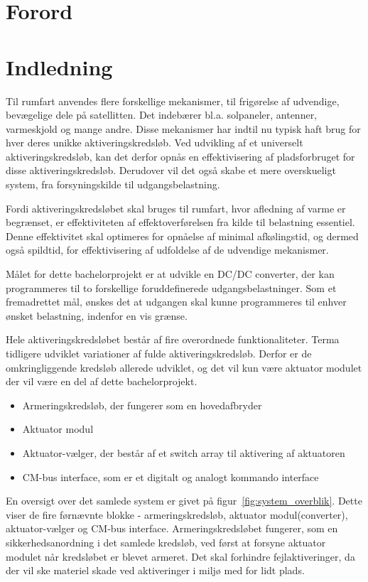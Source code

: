 
\chapter*{Forord}


{\let\clearpage\relax \chapter{Indledning}}
Til rumfart anvendes flere forskellige mekanismer, til frigørelse af udvendige, bevægelige dele på satellitten. Det indebærer bl.a. solpaneler, antenner, varmeskjold og mange andre. Disse mekanismer har indtil nu typisk haft brug for hver deres unikke aktiveringskredsløb. Ved udvikling af et universelt aktiveringskredsløb, kan det derfor opnås en effektivisering af pladsforbruget for disse aktiveringskredsløb. Derudover vil det også skabe et mere overskueligt system, fra forsyningskilde til udgangsbelastning. 

Fordi aktiveringskredsløbet skal bruges til rumfart, hvor afledning af varme er begrænset, er effektiviteten af effektoverførelsen fra kilde til belastning essentiel. Denne effektivitet skal optimeres for opnåelse af minimal afkølingstid, og dermed også spildtid, for effektivisering af udfoldelse af de udvendige mekanismer\cite{projekt-oplag}. 

Målet for dette bachelorprojekt er at udvikle en DC/DC converter, der kan programmeres til to forskellige foruddefinerede udgangsbelastninger. Som et fremadrettet mål, ønskes det at udgangen skal kunne programmeres til enhver ønsket belastning, indenfor en vis grænse. 


Hele aktiveringskredsløbet består af fire overordnede funktionaliteter. Terma tidligere udviklet variationer af fulde aktiveringskredsløb. Derfor er de omkringliggende kredsløb allerede udviklet, og det vil kun være aktuator modulet der vil være en del af dette bachelorprojekt.
\begin{itemize}
	\item Armeringskredsløb, der fungerer som en hovedafbryder
	\item Aktuator modul
	\item Aktuator-vælger, der består af et switch array til aktivering af aktuatoren
	\item CM-bus interface, som er et digitalt og analogt kommando interface
\end{itemize}

En oversigt over det samlede system er givet på figur~\ref{fig:system_overblik}. Dette viser de fire førnævnte blokke - armeringskredsløb, aktuator modul(converter), aktuator-vælger og CM-bus interface. Armeringskredsløbet fungerer, som en sikkerhedsanordning i det samlede kredsløb, ved først at forsyne aktuator modulet når kredsløbet er blevet armeret. Det skal forhindre fejlaktiveringer, da der vil ske materiel skade ved aktiveringer i miljø med for lidt plads. 

